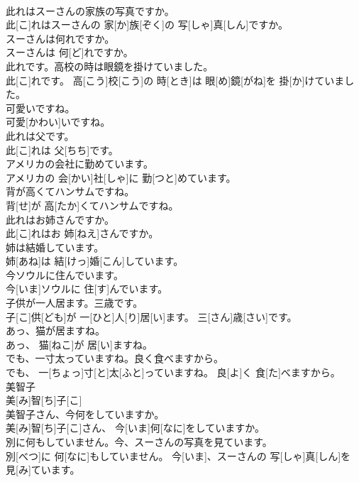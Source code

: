 \documentclass[8pt]{extreport}
\begin{document}
\begin{CJK}{UTF8}{min}
\\	此れはスーさんの家族の写真ですか。	
\\	此[こ]れはスーさんの 家[か]族[ぞく]の 写[しゃ]真[しん]ですか。
\\	スーさんは何れですか。	
\\	スーさんは 何[ど]れですか。
\\	此れです。高校の時は眼鏡を掛けていました。	
\\	此[こ]れです。 高[こう]校[こう]の 時[とき]は 眼[め]鏡[がね]を 掛[か]けていました。
\\	可愛いですね。	
\\	可愛[かわい]いですね。
\\	此れは父です。	
\\	此[こ]れは 父[ちち]です。
\\	アメリカの会社に勤めています。	
\\	アメリカの 会[かい]社[しゃ]に 勤[つと]めています。
\\	背が高くてハンサムですね。	
\\	背[せ]が 高[たか]くてハンサムですね。
\\	此れはお姉さんですか。	
\\	此[こ]れはお 姉[ねえ]さんですか。
\\	姉は結婚しています。	
\\	姉[あね]は 結[けっ]婚[こん]しています。
\\	今ソウルに住んでいます。	
\\	今[いま]ソウルに 住[す]んでいます。
\\	子供が一人居ます。三歳です。	
\\	子[こ]供[ども]が 一[ひと]人[り]居[い]ます。 三[さん]歳[さい]です。
\\	あっ、猫が居ますね。	
\\	あっ、 猫[ねこ]が 居[い]ますね。
\\	でも、一寸太っていますね。良く食べますから。	
\\	でも、 一[ちょっ]寸[と]太[ふと]っていますね。 良[よ]く 食[た]べますから。
\\	美智子	
\\	美[み]智[ち]子[こ]	
\\	美智子さん、今何をしていますか。	
\\	美[み]智[ち]子[こ]さん、 今[いま]何[なに]をしていますか。
\\	別に何もしていません。今、スーさんの写真を見ています。	
\\	別[べつ]に 何[なに]もしていません。 今[いま]、スーさんの 写[しゃ]真[しん]を 見[み]ています。

\end{CJK}
\end{document}

